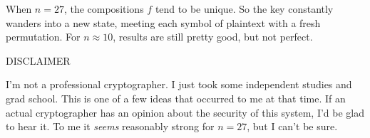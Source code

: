 \documentclass{article}
\renewcommand{\i}{\textit}
\begin{document}
{{When $n = 27$, the compositions $f$ tend to be unique. So the key constantly wanders into a new state, meeting each symbol of plaintext with a fresh permutation. For $n \approx 10$, results are still pretty good, but not perfect. 

DISCLAIMER

I'm not a professional cryptographer. I just took some independent studies and grad school. This is one of a few ideas that occurred to me at that time. If an actual cryptographer has an opinion about the security of this system, I'd be glad to hear it. To me it \i{seems} reasonably strong for $n = 27$, but I can't be sure. 

}}
\end{document}
